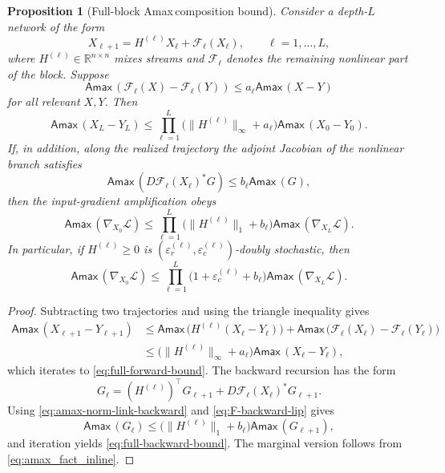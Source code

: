 \documentclass[11pt]{article}
\numberwithin{equation}{section}
\theoremstyle{plain}
\newtheorem{proposition}[theorem]{Proposition}
\theoremstyle{definition}
\theoremstyle{remark}
\newcommand{\R}{\mathbb{R}}
\newcommand{\Amax}{\textsf{Amax}\,}
\begin{document}
\begin{proposition}[Full-block \Amax composition bound]\label{prop:full-block-amax}
Consider a depth-$L$ network of the form
\begin{equation}\label{eq:full-block-generic}
        X_{\ell+1}=H^{(\ell)}X_\ell+\mathcal F_\ell(X_\ell),
        \qquad \ell=1,\dots,L,
\end{equation}
where $H^{(\ell)}\in\R^{n\times n}$ mixes streams and $\mathcal F_\ell$ denotes the remaining nonlinear part of the block. Suppose
\begin{equation}\label{eq:F-forward-lip}
        \Amax(\mathcal F_\ell(X)-\mathcal F_\ell(Y))
        \le a_\ell\Amax(X-Y)
\end{equation}
for all relevant $X,Y$. Then
\begin{equation}\label{eq:full-forward-bound}
        \Amax(X_L-Y_L)
        \le
        \prod_{\ell=1}^L\bigl(\|H^{(\ell)}\|_\infty+a_\ell\bigr)
        \Amax(X_0-Y_0).
\end{equation}
If, in addition, along the realized trajectory the adjoint Jacobian of the nonlinear branch satisfies
\begin{equation}\label{eq:F-backward-lip}
        \Amax\!\left(D\mathcal F_\ell(X_\ell)^*G\right)
        \le b_\ell\Amax(G),
\end{equation}
then the input-gradient amplification obeys
\begin{equation}\label{eq:full-backward-bound}
        \Amax(\nabla_{X_0}\mathcal L)
        \le
        \prod_{\ell=1}^L\bigl(\|H^{(\ell)}\|_1+b_\ell\bigr)
        \Amax(\nabla_{X_L}\mathcal L).
\end{equation}
In particular, if $H^{(\ell)}\ge0$ is $(\varepsilon_r^{(\ell)},\varepsilon_c^{(\ell)})$-doubly stochastic, then
\begin{equation}\label{eq:full-block-marginal-bound}
        \Amax(\nabla_{X_0}\mathcal L)
        \le
        \prod_{\ell=1}^L\bigl(1+\varepsilon_c^{(\ell)}+b_\ell\bigr)
        \Amax(\nabla_{X_L}\mathcal L).
\end{equation}
\end{proposition}

\begin{proof}
Subtracting two trajectories and using the triangle inequality gives
\[
\begin{aligned}
\Amax(X_{\ell+1}-Y_{\ell+1})
&\le \Amax\bigl(H^{(\ell)}(X_\ell-Y_\ell)\bigr)
 +\Amax\bigl(\mathcal F_\ell(X_\ell)-\mathcal F_\ell(Y_\ell)\bigr)\\
&\le \bigl(\|H^{(\ell)}\|_\infty+a_\ell\bigr)\Amax(X_\ell-Y_\ell),
\end{aligned}
\]
which iterates to \eqref{eq:full-forward-bound}. The backward recursion has the form
\[
        G_\ell=(H^{(\ell)})^\top G_{\ell+1}+D\mathcal F_\ell(X_\ell)^*G_{\ell+1}.
\]
Using \eqref{eq:amax-norm-link-backward} and \eqref{eq:F-backward-lip} gives
\[
        \Amax(G_\ell)
        \le \bigl(\|H^{(\ell)}\|_1+b_\ell\bigr)\Amax(G_{\ell+1}),
\]
and iteration yields \eqref{eq:full-backward-bound}. The marginal version follows from \eqref{eq:amax_fact_inline}.
\end{proof}
\end{document}
